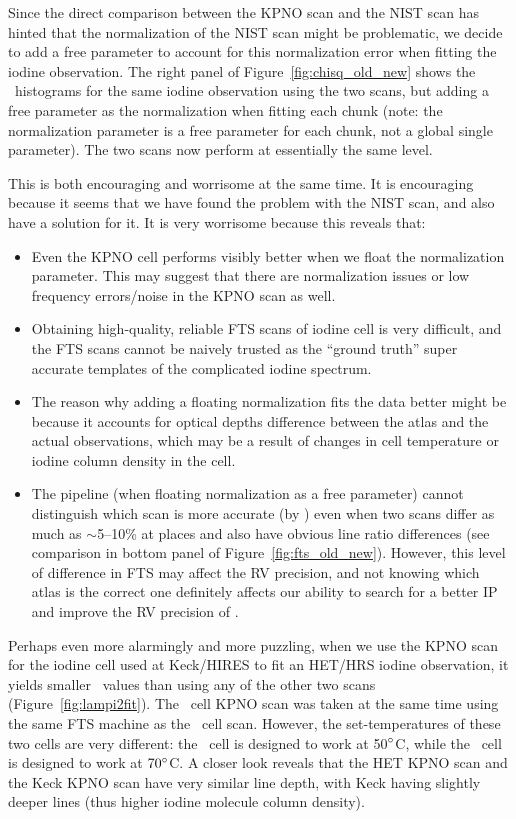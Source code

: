 Since the direct comparison between the KPNO scan and the NIST scan
has hinted that the normalization of the NIST scan might be
problematic, we decide to add a free parameter to account for this
normalization error when fitting the iodine observation. The right
panel of Figure~\ref{fig:chisq_old_new} shows the \chisq\ histograms
for the same iodine observation using the two scans, but adding a free
parameter as the normalization when fitting each chunk (note: the
normalization parameter is a free parameter for each chunk, not a
global single parameter). The two scans now perform at essentially the
same level.

This is both encouraging and worrisome at the same time. It is
encouraging because it seems that we have found the problem with the
NIST scan, and also have a solution for it. It is very worrisome
because this reveals that:
\begin{itemize}
  \item Even the KPNO cell performs visibly better when we float the
    normalization parameter. This may suggest that there are
    normalization issues or low frequency errors/noise in the KPNO
    scan as well.
  \item Obtaining high-quality, reliable FTS scans of iodine cell is
    very difficult, and the FTS scans cannot be naively trusted as the
    ``ground truth'' super accurate templates of the complicated iodine
    spectrum.
  \item The reason why adding a floating normalization fits the
    data better might be because it accounts for optical depths difference
    between the atlas and the actual observations, which may be a result
    of changes in cell temperature or iodine column density in the cell.
  \item The pipeline (when floating normalization as a free parameter)
    cannot distinguish which scan is more accurate (by \chisq)
    even when two scans differ as much as $\sim$5--10\% at places and
    also have obvious line ratio differences (see comparison in bottom
    panel of Figure~\ref{fig:fts_old_new}). However, this level of
    difference in FTS may affect the RV precision, and not knowing
    which atlas is the correct one definitely affects our ability to
    search for a better IP and improve the RV precision of \het.
\end{itemize}  

Perhaps even more alarmingly and more puzzling, when we use the KPNO
scan for the iodine cell used at Keck/HIRES to fit an HET/HRS iodine
observation, it yields smaller \chisq\ values than using any of the
other two scans (Figure~\ref{fig:lampi2fit}). The \het\ cell KPNO scan
was taken at the same time using the same FTS machine as the \keck\
cell scan. However, the set-temperatures of these two cells are very
different: the \keck\ cell is designed to work at 50$^{\circ}$C, while
the \het\ cell is designed to work at $70^{\circ}$C. A closer look
reveals that the HET KPNO scan and the Keck KPNO scan have very
similar line depth, with Keck having slightly deeper lines (thus
higher iodine molecule column density).


